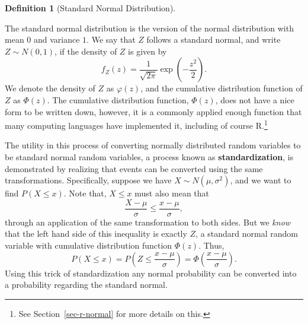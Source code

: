 \documentclass[
  letterpaper,
  DIV=11,
  numbers=noendperiod]{scrreprt}
\theoremstyle{definition}
\theoremstyle{definition}
\theoremstyle{definition}
\newtheorem{definition}{Definition}[chapter]
\theoremstyle{remark}
\begin{document}
\begin{definition}[Standard Normal
Distribution]\protect\hypertarget{def-standard-normal}{}\label{def-standard-normal}

The standard normal distribution is the version of the normal
distribution with mean \(0\) and variance \(1\). We say that \(Z\)
follows a standard normal, and write \(Z\sim N(0,1)\), if the density of
\(Z\) is given by
\[f_Z(z) = \frac{1}{\sqrt{2\pi}}\exp\left(-\frac{z^2}{2}\right).\] We
denote the density of \(Z\) as \(\varphi(z)\), and the cumulative
distribution function of \(Z\) as \(\Phi(z)\). The cumulative
distribution function, \(\Phi(z)\), does not have a nice form to be
written down, however, it is a commonly applied enough function that
many computing languages have implemented it, including of course
R.\footnote{See Section~\ref{sec-r-normal} for more details on this.}

\end{definition}

The utility in this process of converting normally distributed random
variables to be standard normal random variables, a process known as
\textbf{standardization}, is demonstrated by realizing that events can
be converted using the same transformations. Specifically, suppose we
have \(X \sim N(\mu,\sigma^2)\), and we want to find \(P(X \leq x)\).
Note that, \(X \leq x\) must also mean that
\[\frac{X-\mu}{\sigma} \leq \frac{x - \mu}{\sigma},\] through an
application of the same transformation to both sides. But we \emph{know}
that the left hand side of this inequality is exactly \(Z\), a standard
normal random variable with cumulative distribution function
\(\Phi(z)\). Thus,
\[P(X \leq x) = P\left(Z \leq \frac{x - \mu}{\sigma}\right) = \Phi\left(\frac{x-\mu}{\sigma}\right).\]
Using this trick of standardization any normal probability can be
converted into a probability regarding the standard normal.
\end{document}
